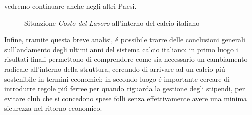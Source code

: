 \documentclass[
    corpo=12pt,
    oneside,
    evenboxes,
    tipotesi=triennale,
    stile=classica,
    oldstyle,
    autoretitolo,
    greek,
]{toptesi}
\begin{document}
\begin{interlinea}{1.5}
vedremo continuare anche negli altri Paesi.\newline
\begin{figure}
    \centering
     \quad
    \caption{Situazione \emph{Costo del Lavoro} all'interno del calcio italiano}
    \label{wage_serieA}  
\end{figure}\newline
Infine, tramite questa breve analisi, \'e possibile trarre delle conclusioni generali sull'andamento degli ultimi anni del sistema calcio 
italiano: in primo luogo i risultati finali permettono di comprendere come sia necessario un cambiamento radicale all'interno della struttura,
cercando di arrivare ad un calcio pi\'u sostenibile in termini economici; in secondo luogo \'e importante cercare di introdurre regole pi\'u
ferree per quando riguarda la gestione degli stipendi, per evitare club che si concedono spese folli senza effettivamente avere una minima
sicurezza nel ritorno economico.

\end{interlinea}
\end{document}
